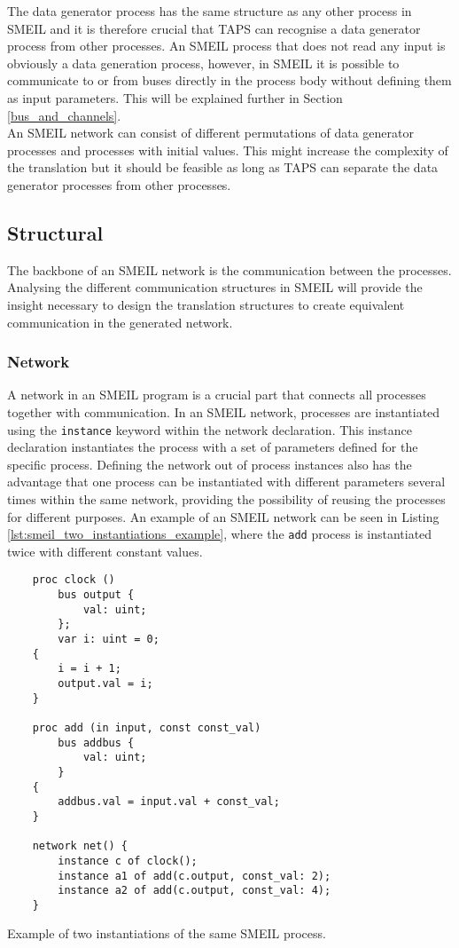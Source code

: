 The data generator process has the same structure as any other process in SMEIL and it is therefore crucial that TAPS can recognise a data generator process from other processes. An SMEIL process that does not read any input is obviously a data generation process, however, in SMEIL it is possible to communicate to or from buses directly in the process body without defining them as input parameters. This will be explained further in Section \ref{bus_and_channels}. \\

An SMEIL network can consist of different permutations of data generator processes and processes with initial values. This might increase the complexity of the translation but it should be feasible as long as TAPS can separate the data generator processes from other processes.
\subsection{Structural}
\label{sec:analysis_structural}
The backbone of an SMEIL network is the communication between the processes. Analysing the different communication structures in SMEIL will provide the insight necessary to design the translation structures to create equivalent communication in the generated \cspm{} network.
\subsubsection{Network}
A network in an SMEIL program is a crucial part that connects all processes together with communication. In an SMEIL network, processes are instantiated using the \texttt{instance} keyword within the network declaration. This instance declaration instantiates the process with a set of parameters defined for the specific process.
Defining the network out of process instances also has the advantage that one process can be instantiated with different parameters several times within the same network, providing the possibility of reusing the processes for different purposes. An example of an SMEIL network can be seen in Listing \ref{lst:smeil_two_instantiations_example}, where the \texttt{add} process is instantiated twice with different constant values.\\
\begin{listing}
    \begin{verbatim}
    proc clock ()
        bus output {
            val: uint;
        };
        var i: uint = 0;
    {
        i = i + 1;
        output.val = i;
    }

    proc add (in input, const const_val)
        bus addbus {
            val: uint;
        }
    {
        addbus.val = input.val + const_val;
    }

    network net() {
        instance c of clock();
        instance a1 of add(c.output, const_val: 2);
        instance a2 of add(c.output, const_val: 4);
    }
    \end{verbatim}
    \caption{Example of two instantiations of the same SMEIL process.}
    \label{lst:smeil_two_instantiations_example}
\end{listing}

